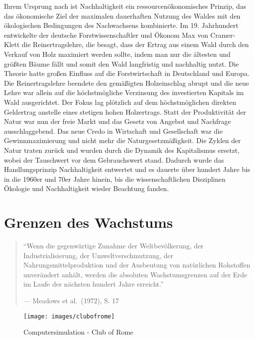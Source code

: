 \documentclass[
]{book}
\begin{document}
Ihrem Ursprung nach ist Nachhaltigkeit ein ressourcenökonomisches Prinzip, das das ökonomische Ziel der maximalen dauerhaften Nutzung des Waldes mit den ökologischen Bedingungen des Nachwachsens kombinierte. Im 19. Jahrhundert entwickelte der deutsche Forstwissenschaftler und Ökonom Max von Cramer-Klett die Reinertragslehre, die besagt, dass der Ertrag aus einem Wald durch den Verkauf von Holz maximiert werden sollte, indem man nur die ältesten und größten Bäume fällt und somit den Wald langfristig und nachhaltig nutzt. Die Theorie hatte großen Einfluss auf die Forstwirtschaft in Deutschland und Europa. Die Reinertragslehre beendete den gemäßigten Holzeinschlag abrupt und die neue Lehre war allein auf die höchstmögliche Verzinsung des investierten Kapitals im Wald ausgerichtet. Der Fokus lag plötzlich auf dem höchstmöglichen direkten Geldertrag anstelle eines stetigen hohen Holzertrags. Statt der Produktivität der Natur war nun der freie Markt und das Gesetz von Angebot und Nachfrage ausschlaggebend. Das neue Credo in Wirtschaft und Gesellschaft war die Gewinnmaximierung und nicht mehr die Naturgesetzmäßigkeit. Die Zyklen der Natur traten zurück und wurden durch die Dynamik des Kapitalismus ersetzt, wobei der Tauschwert vor dem Gebrauchswert stand. Dadurch wurde das Handlungsprinzip Nachhaltigkeit entwertet und es dauerte über hundert Jahre bis in die 1960er und 70er Jahre hinein, bis die wissenschaftlichen Disziplinen Ökologie und Nachhaltigkeit wieder Beachtung fanden.

\hypertarget{grenzen-des-wachstums}{%
\section{Grenzen des Wachstums}\label{grenzen-des-wachstums}}

\begin{quote}
``Wenn die gegenwärtige Zunahme der Weltbevölkerung, der Industrialisierung, der Umweltverschmutzung, der Nahrungsmittelproduktion und der Ausbeutung von natürlichen Rohstoffen unverändert anhält, werden die absoluten Wachstumsgrenzen auf der Erde im Laufe der nächsten hundert Jahre erreicht.''

--- Meadows et al.~(1972), S. 17
\end{quote}

\begin{figure}

{\centering \texttt{[image: images/clubofrome]} 

}

\caption{Computersimulation - Club of Rome}\label{fig:clubofrome}
\end{figure}
\end{document}

